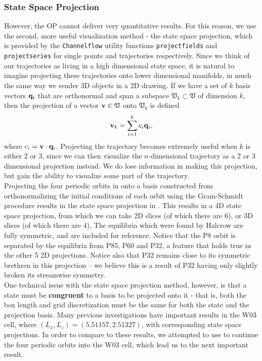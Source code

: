 \subsubsection{State Space Projection}
However, the OP cannot deliver very quantitative results. For this reason, we use the second, more useful visualization method - the state space projection, which is provided by the {\tt Channelflow} utility functions {\tt projectfields} and {\tt projectseries} for single points and trajectories respectively. Since we think of our trajectories as living in a high dimensional state space, it is natural to imagine projecting these trajectories onto lower dimensional manifolds, in much the same way we render 3D objects in a 2D drawing. If we have a set of $k$ basis vectors $\mathbf{q}_i$ that are orthonormal and span a subspace $\mathfrak{V}_k \subset \mathfrak{V}$ of dimension $k$, then the projection of a vector $\mathbf{v} \in \mathfrak{V}$ onto $\mathfrak{V}_k$ is defined 
\begin{equation}
\Vector{v}_k = \sum{i = 1}{k}{c_i \Vector{q}_i},
\end{equation}
where $c_i = \mathbf{v} \cdot \mathbf{q}_i$. Projecting the trajectory becomes extremely useful when $k$ is either 2 or 3, since we can then visualize the $n$-dimensional trajectory as a 2 or 3 dimensional projection instead. We do lose information in making this projection, but gain the ability to visualize some part of the trajectory. \\

Projecting the four periodic orbits in  onto a basis constructed from orthonormalizing the initial conditions of each orbit using the Gram-Schmidt procedure results in the state space projection in . This results in a 4D state space projection, from which we can take 2D slices (of which there are 6), or 3D slices (of which there are 4). The equilibria which were found by Halcrow are fully symmetric, and are included for reference.  Notice that the P8 orbit is separated by the equilibria from P85, P60 and P32, a feature that holds true in the other 5 2D projections. Notice also that P32 remains close to its symmetric brethren in this projection -- we believe this is a result of P32 having only slightly broken its streamwise symmetry. \\

One technical  issue with the state space projection method, however, is that a state must be {\bf congruent} to a basis to be projected onto it - that is, both the box length and grid discretization must be the same for both the state and the projection basis. Many previous investigations have important results in the W03 cell, where $(L_x,L_z) = (5.51157,2.51327)$, with corresponding state space projections. In order to compare to these results, we attempted to use  to continue the four periodic orbits into the W03 cell, which lead us to the next important result.

